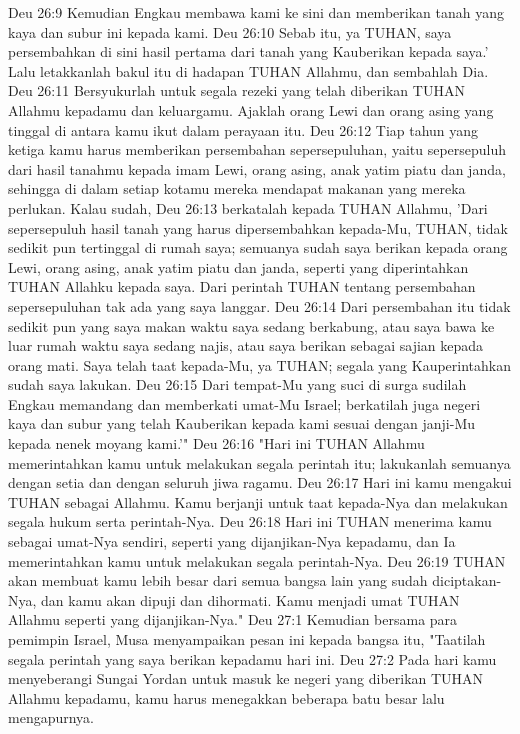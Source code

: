 Deu 26:9  Kemudian Engkau membawa kami ke sini dan memberikan tanah yang kaya dan subur ini kepada kami.
Deu 26:10  Sebab itu, ya TUHAN, saya persembahkan di sini hasil pertama dari tanah yang Kauberikan kepada saya.' Lalu letakkanlah bakul itu di hadapan TUHAN Allahmu, dan sembahlah Dia.
Deu 26:11  Bersyukurlah untuk segala rezeki yang telah diberikan TUHAN Allahmu kepadamu dan keluargamu. Ajaklah orang Lewi dan orang asing yang tinggal di antara kamu ikut dalam perayaan itu.
Deu 26:12  Tiap tahun yang ketiga kamu harus memberikan persembahan sepersepuluhan, yaitu sepersepuluh dari hasil tanahmu kepada imam Lewi, orang asing, anak yatim piatu dan janda, sehingga di dalam setiap kotamu mereka mendapat makanan yang mereka perlukan. Kalau sudah,
Deu 26:13  berkatalah kepada TUHAN Allahmu, 'Dari sepersepuluh hasil tanah yang harus dipersembahkan kepada-Mu, TUHAN, tidak sedikit pun tertinggal di rumah saya; semuanya sudah saya berikan kepada orang Lewi, orang asing, anak yatim piatu dan janda, seperti yang diperintahkan TUHAN Allahku kepada saya. Dari perintah TUHAN tentang persembahan sepersepuluhan tak ada yang saya langgar.
Deu 26:14  Dari persembahan itu tidak sedikit pun yang saya makan waktu saya sedang berkabung, atau saya bawa ke luar rumah waktu saya sedang najis, atau saya berikan sebagai sajian kepada orang mati. Saya telah taat kepada-Mu, ya TUHAN; segala yang Kauperintahkan sudah saya lakukan.
Deu 26:15  Dari tempat-Mu yang suci di surga sudilah Engkau memandang dan memberkati umat-Mu Israel; berkatilah juga negeri kaya dan subur yang telah Kauberikan kepada kami sesuai dengan janji-Mu kepada nenek moyang kami.'"
Deu 26:16  "Hari ini TUHAN Allahmu memerintahkan kamu untuk melakukan segala perintah itu; lakukanlah semuanya dengan setia dan dengan seluruh jiwa ragamu.
Deu 26:17  Hari ini kamu mengakui TUHAN sebagai Allahmu. Kamu berjanji untuk taat kepada-Nya dan melakukan segala hukum serta perintah-Nya.
Deu 26:18  Hari ini TUHAN menerima kamu sebagai umat-Nya sendiri, seperti yang dijanjikan-Nya kepadamu, dan Ia memerintahkan kamu untuk melakukan segala perintah-Nya.
Deu 26:19  TUHAN akan membuat kamu lebih besar dari semua bangsa lain yang sudah diciptakan-Nya, dan kamu akan dipuji dan dihormati. Kamu menjadi umat TUHAN Allahmu seperti yang dijanjikan-Nya."
Deu 27:1  Kemudian bersama para pemimpin Israel, Musa menyampaikan pesan ini kepada bangsa itu, "Taatilah segala perintah yang saya berikan kepadamu hari ini.
Deu 27:2  Pada hari kamu menyeberangi Sungai Yordan untuk masuk ke negeri yang diberikan TUHAN Allahmu kepadamu, kamu harus menegakkan beberapa batu besar lalu mengapurnya.

